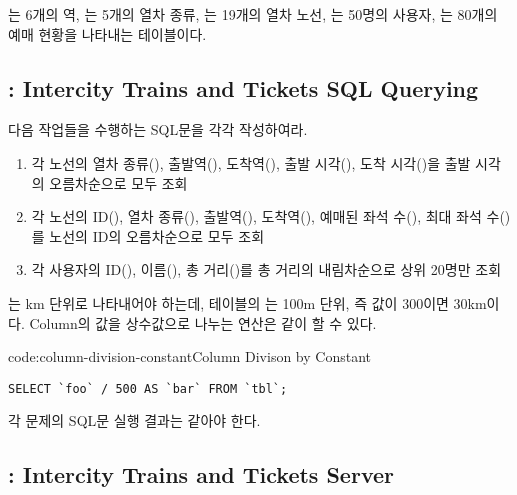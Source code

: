 는 6개의 역, 는 5개의 열차 종류, 는 19개의 열차 노선, 는 50명의 사용자, 는 80개의 예매 현황을 나타내는 테이블이다.

\subsection*{: Intercity Trains and Tickets SQL Querying}

다음 작업들을 수행하는 SQL문을 각각 작성하여라.

\begin{enumerate}
    \item 각 노선의 열차 종류(), 출발역(), 도착역(), 출발 시각(), 도착 시각()을 출발 시각의 오름차순으로 모두 조회
    \item 각 노선의 ID(), 열차 종류(), 출발역(), 도착역(), 예매된 좌석 수(), 최대 좌석 수()를 노선의 ID의 오름차순으로 모두 조회
    \item 각 사용자의 ID(), 이름(), 총 거리()를 총 거리의 내림차순으로 상위 20명만 조회
\end{enumerate}

는 km 단위로 나타내어야 하는데,  테이블의 는 100m 단위, 즉 값이 300이면 30km이다. Column의 값을 상수값으로 나누는 연산은 \와 같이 할 수 있다.

\begin{codeenv}{code:column-division-constant}{Column Divison by Constant}\begin{verbatim}
SELECT `foo` / 500 AS `bar` FROM `tbl`;
\end{verbatim}
\end{codeenv}


각 문제의 SQL문 실행 결과는 \와 같아야 한다.

\subsection*{: Intercity Trains and Tickets Server}

